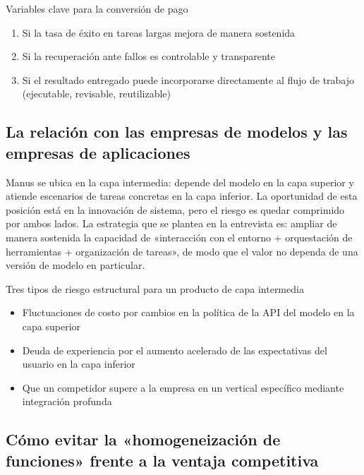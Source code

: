 \documentclass[a4paper]{article}
\begin{document}
\begin{importantbox}{Variables clave para la conversión de pago}
\begin{enumerate}
    \item Si la tasa de éxito en tareas largas mejora de manera sostenida
    \item Si la recuperación ante fallos es controlable y transparente
    \item Si el resultado entregado puede incorporarse directamente al flujo de trabajo (ejecutable, revisable, reutilizable)
\end{enumerate}
\end{importantbox}

\subsection{La relación con las empresas de modelos y las empresas de aplicaciones}

Manus se ubica en la capa intermedia: depende del modelo en la capa superior y atiende escenarios de tareas concretas en la capa inferior. La oportunidad de esta posición está en la innovación de sistema, pero el riesgo es quedar comprimido por ambos lados. La estrategia que se plantea en la entrevista es: ampliar de manera sostenida la capacidad de «interacción con el entorno + orquestación de herramientas + organización de tareas», de modo que el valor no dependa de una versión de modelo en particular.

\begin{warningbox}{Tres tipos de riesgo estructural para un producto de capa intermedia}
\begin{itemize}
    \item Fluctuaciones de costo por cambios en la política de la API del modelo en la capa superior
    \item Deuda de experiencia por el aumento acelerado de las expectativas del usuario en la capa inferior
    \item Que un competidor supere a la empresa en un vertical específico mediante integración profunda
\end{itemize}
\end{warningbox}

\subsection{Cómo evitar la «homogeneización de funciones» frente a la ventaja competitiva}
\end{document}
